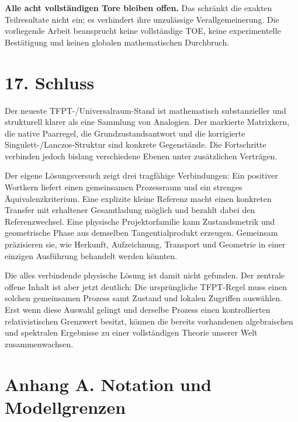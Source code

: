 \textbf{Alle acht vollständigen Tore bleiben offen.} Das schränkt die
exakten Teilresultate nicht ein; es verhindert ihre unzulässige
Verallgemeinerung. Die vorliegende Arbeit beansprucht keine vollständige
TOE, keine experimentelle Bestätigung und keinen globalen mathematischen
Durchbruch.

\section{17. Schluss}\label{schluss}

Der neueste TFPT-/Universalraum-Stand ist mathematisch substanzieller
und strukturell klarer als eine Sammlung von Analogien. Der markierte
Matrixkern, die native Paarregel, die Grundzustandsantwort und die
korrigierte Singulett-/Lanczos-Struktur sind konkrete Gegenstände. Die
Fortschritte verbinden jedoch bislang verschiedene Ebenen unter
zusätzlichen Verträgen.

Der eigene Lösungsversuch zeigt drei tragfähige Verbindungen: Ein
positiver Wortkern liefert einen gemeinsamen Prozessraum und ein
strenges Äquivalenzkriterium. Eine explizite kleine Referenz macht einen
konkreten Transfer mit erhaltener Gesamtladung möglich und bezahlt dabei
den Referenzwechsel. Eine physische Projektorfamilie kann Zustandsmetrik
und geometrische Phase aus demselben Tangentialprodukt erzeugen.
Gemeinsam präzisieren sie, wie Herkunft, Aufzeichnung, Transport und
Geometrie in einer einzigen Ausführung behandelt werden könnten.

Die alles verbindende physische Lösung ist damit nicht gefunden. Der
zentrale offene Inhalt ist aber jetzt deutlich: Die ursprüngliche
TFPT-Regel muss einen solchen gemeinsamen Prozess samt Zustand und
lokalen Zugriffen auswählen. Erst wenn diese Auswahl gelingt und
derselbe Prozess einen kontrollierten relativistischen Grenzwert
besitzt, können die bereits vorhandenen algebraischen und spektralen
Ergebnisse zu einer vollständigen Theorie unserer Welt zusammenwachsen.

\section{Anhang A. Notation und
Modellgrenzen}\label{anhang-a.-notation-und-modellgrenzen}

